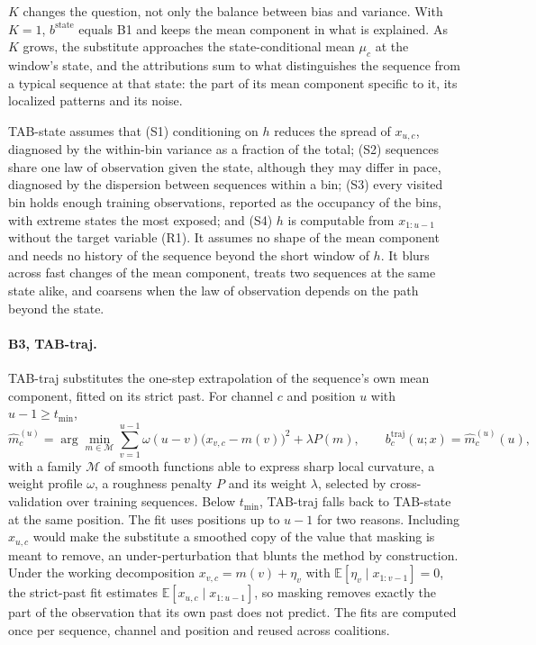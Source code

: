 \documentclass{article}
\begin{document}
$K$ changes the question, not only the balance between bias and variance. With $K=1$, $b^{\mathrm{state}}$ equals B1 and keeps the mean component in what is explained. As $K$ grows, the substitute approaches the state-conditional mean $\mu_c$ at the window's state, and the attributions sum to what distinguishes the sequence from a typical sequence at that state: the part of its mean component specific to it, its localized patterns and its noise.

TAB-state assumes that (S1) conditioning on $h$ reduces the spread of $x_{u,c}$, diagnosed by the within-bin variance as a fraction of the total; (S2) sequences share one law of observation given the state, although they may differ in pace, diagnosed by the dispersion between sequences within a bin; (S3) every visited bin holds enough training observations, reported as the occupancy of the bins, with extreme states the most exposed; and (S4) $h$ is computable from $x_{1:u-1}$ without the target variable (R1). It assumes no shape of the mean component and needs no history of the sequence beyond the short window of $h$. It blurs across fast changes of the mean component, treats two sequences at the same state alike, and coarsens when the law of observation depends on the path beyond the state.

\paragraph{B3, TAB-traj.} TAB-traj substitutes the one-step extrapolation of the sequence's own mean component, fitted on its strict past. For channel $c$ and position $u$ with $u-1\ge t_{\min}$,
\begin{equation}\label{eq:tabtraj}
\hat m^{(u)}_c = \arg\min_{m\in\mathcal{M}} \sum_{v=1}^{u-1}\omega(u-v)\bigl(x_{v,c}-m(v)\bigr)^2 + \lambda P(m),
\qquad b^{\mathrm{traj}}_c(u;x) = \hat m^{(u)}_c(u),
\end{equation}
with a family $\mathcal{M}$ of smooth functions able to express sharp local curvature, a weight profile $\omega$, a roughness penalty $P$ and its weight $\lambda$, selected by cross-validation over training sequences. Below $t_{\min}$, TAB-traj falls back to TAB-state at the same position. The fit uses positions up to $u-1$ for two reasons. Including $x_{u,c}$ would make the substitute a smoothed copy of the value that masking is meant to remove, an under-perturbation that blunts the method by construction. Under the working decomposition $x_{v,c}=m(v)+\eta_v$ with $\mathbb{E}[\eta_v\mid x_{1:v-1}]=0$, the strict-past fit estimates $\mathbb{E}[x_{u,c}\mid x_{1:u-1}]$, so masking removes exactly the part of the observation that its own past does not predict. The fits are computed once per sequence, channel and position and reused across coalitions.
\end{document}
